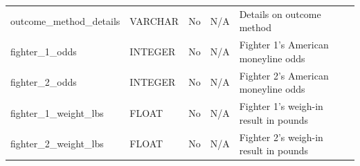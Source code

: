 \documentclass[12pt,twoside]{report}
\begin{document}
\begin{longtable}{lllll}
outcome\_method\_details             & VARCHAR   & No          & N/A                   & Details on outcome method                                                                          \\
fighter\_1\_odds                     & INTEGER   & No          & N/A                   & Fighter 1's American moneyline odds                                                                \\
fighter\_2\_odds                     & INTEGER   & No          & N/A                   & Fighter 2's American moneyline odds                                                                \\
fighter\_1\_weight\_lbs              & FLOAT     & No          & N/A                   & Fighter 1's weigh-in result in pounds                                                              \\
fighter\_2\_weight\_lbs              & FLOAT     & No          & N/A                   & Fighter 2's weigh-in result in pounds                                                              \\
\bottomrule
\end{longtable}
\normalsize
\end{document}
